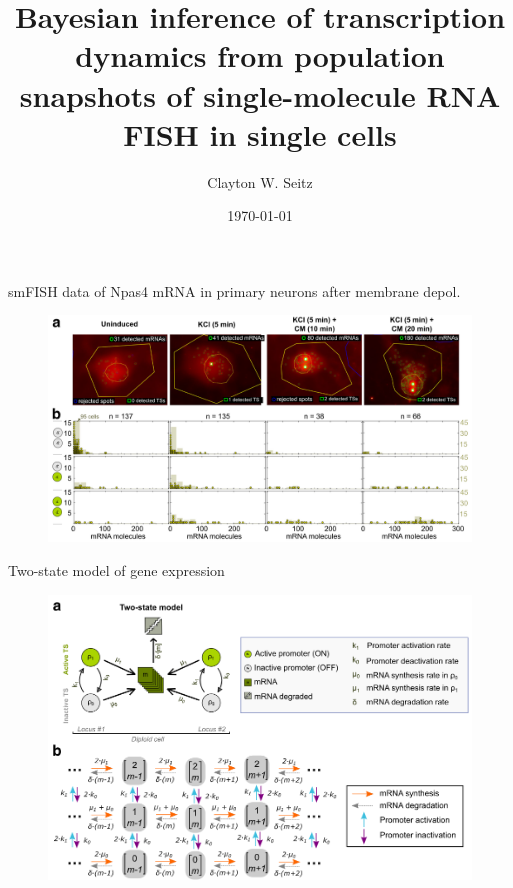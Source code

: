 \documentclass[aspectratio=1610]{beamer}					%
\title{Bayesian inference of transcription dynamics from population snapshots of single-molecule RNA FISH in single cells}	%
\author{Clayton W. Seitz}								%
\date{\today}									%
\begin{document}
\begin{frame}
  \titlepage
\end{frame}


%

\begin{frame}{smFISH data of Npas4 mRNA in primary neurons after membrane depol.}

\begin{figure}
\includegraphics[width=14cm]{figure-1.png}
\end{figure}

\end{frame}

\begin{frame}{Two-state model of gene expression}

\begin{figure}
\includegraphics[width=12cm]{figure-2.png}
\end{figure}

\end{frame}
\end{document}
